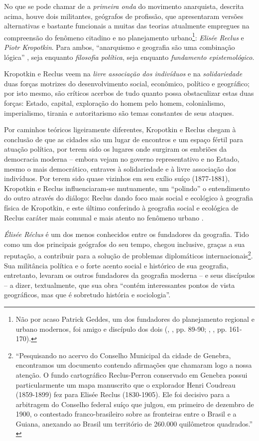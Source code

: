 No que se pode chamar de a \textit{primeira onda} do movimento anarquista, descrita acima, houve dois militantes, geógrafos de profissão, que apresentaram versões alternativas e bastante funcionais a muitas das teorias atualmente empregues na compreensão do fenômeno citadino e no planejamento urbano\footnote{Não por acaso Patrick Geddes, um dos fundadores do planejamento regional e urbano modernos, foi amigo e discípulo dos dois (\citeauthor{dunbar_elisee_1989}, \citeyear{dunbar_elisee_1989}, pp. 89-90; \citeauthor{hall_cidades_2007}, \citeyear{hall_cidades_2007}, pp. 161-170).}: \textit{Elisée Reclus }e \textit{Piotr Kropotkin}. Para ambos, ``anarquismo e geografia são uma combinação lógica'' \cite[p.~78]{dunbar_elisee_1989}, seja enquanto \textit{filosofia política}, seja enquanto \textit{fundamento epistemológico}.

Kropotkin e Reclus veem na \textit{livre associação dos indivíduos} e na \textit{solidariedade} duas forças motrizes do desenvolvimento social, econômico, político e geográfico; por isto mesmo, são críticos acerbos de tudo quanto possa obstaculizar estas duas forças: Estado, capital, exploração do homem pelo homem, colonialismo, imperialismo, tirania e autoritarismo são temas constantes de seus ataques.

Por caminhos teóricos ligeiramente diferentes, Kropotkin e Reclus chegam à conclusão de que as cidades são um lugar de encontros e um espaço fértil para atuação política, por terem sido os lugares onde surgiram os embriões da democracia moderna -- embora vejam no governo representativo e no Estado, mesmo o mais democrático, entraves à solidariedade e à livre associação dos indivíduos. Por terem sido quase vizinhos em seu exílio suíço (1877-1881), Kropotkin e Reclus influenciaram-se mutuamente, um ``polindo'' o entendimento do outro através do diálogo: Reclus dando foco mais social e ecológico à geografia física de Kropotkin, e este último conferindo à geografia social e ecológica de Reclus caráter mais comunal e mais atento no fenômeno urbano \cite[p.~209-210]{WARD2010}.

\textit{Élisée Réclus} é um dos menos conhecidos entre os fundadores da geografia. Tido como um dos principais geógrafos do seu tempo, chegou inclusive, graças a sua reputação, a contribuir para a solução de problemas diplomáticos internacionais\footnote{``Pesquisando no acervo do Conselho Municipal da cidade de Genebra, encontramos um documento contendo afirmações que chamaram logo a nossa atenção. O fundo cartográfico Reclus-Perron conservado em Genebra possui particularmente um mapa manuscrito que o explorador Henri Coudreau (1859-1899) fez para Elisée Reclus (1830-1905). Ele foi decisivo para a arbitragem do Conselho federal suíço que julgou, em primeiro de dezembro de 1900, o contestado franco-brasileiro sobre as fronteiras entre o Brasil e a Guiana, anexando ao Brasil um território de 260.000 quilômetros quadrados.'' \cite[p.~2]{FERRETTI2013}}. Sua militância política e o forte acento social e histórico de sua geografia, entretanto, levaram os outros fundadores da geografia moderna -- e seus discípulos -- a dizer, textualmente, que sua obra ``contém interessantes pontos de vista geográficos, mas que é sobretudo história e sociologia''.

